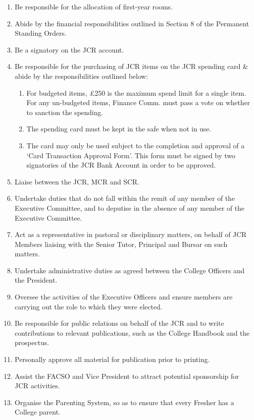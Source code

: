 \begin{enumerate}
        \item Be responsible for the allocation of first-year rooms.
        \item Abide by the financial responsibilities outlined in Section 8 of the Permanent Standing Orders. %
        \item Be a signatory on the JCR account.
        \item Be responsible for the purchasing of JCR items on the JCR spending card & abide by the responsibilities outlined below:
        \begin{enumerate}
            \item For budgeted items, £250 is the maximum spend limit for a single item. For any un-budgeted items, Finance Comm. must pass a vote on whether to sanction the spending.
            \item The spending card must be kept in the safe when not in use.
            \item The card may only be used subject to the completion and approval of a ‘Card Transaction Approval Form’. This form must be signed by two signatories of the JCR Bank Account in order to be approved.
        \end{enumerate}
        \item Liaise between the JCR, MCR and SCR.
        \item Undertake duties that do not fall within the remit of any member of the Executive Committee, and to deputise in the absence of any member of the Executive Committee.
        \item Act as a representative in pastoral or disciplinary matters, on behalf of JCR Members liaising with the Senior Tutor, Principal and Bursar on such matters.
        \item Undertake administrative duties as agreed between the College Officers and the President.
        \item Oversee the activities of the Executive Officers and ensure members are carrying out the role to which they were elected.
        \item Be responsible for public relations on behalf of the JCR and to write contributions to relevant publications, such as the College Handbook and the prospectus.
        \item Personally approve all material for publication prior to printing.
        \item Assist the FACSO and Vice President to attract potential sponsorship for JCR activities.
        \item Organise the Parenting System, so as to ensure that every Fresher has a College parent.

\end{enumerate}
